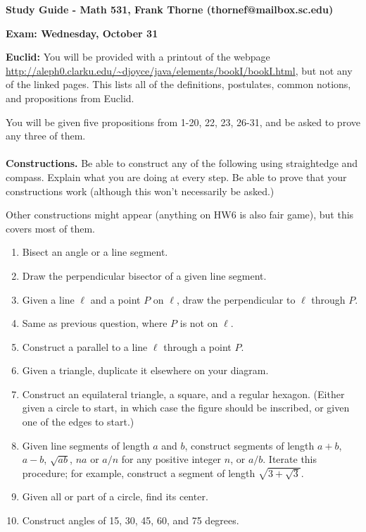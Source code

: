 \documentclass[12pt]{article}
\begin{document}
\setlength{\topmargin}{-2mm}





\begin{center}{\bf Study Guide - Math 531, Frank Thorne (thornef@mailbox.sc.edu)}
\end{center}
\begin{center}
{\bf Exam: Wednesday, October 31}
\end{center}

{\bf Euclid:} You will be provided with a printout of the webpage
\url{http://aleph0.clarku.edu/~djoyce/java/elements/bookI/bookI.html},
but not any of the linked pages. This lists all of the definitions,
postulates, common notions, and propositions from Euclid.

You will be given five propositions from 1-20, 22, 23, 26-31, and be asked to prove any
three of them.
\\
\\
{\bf Constructions.} Be able to construct any of the following using straightedge
and compass. Explain what you are doing at every step. Be able to prove that
your constructions work (although this won't necessarily be asked.)

Other constructions might appear (anything on HW6 is also fair game), but this covers most of them.
\begin{enumerate}[(1)]
\item
Bisect an angle or a line segment.
\item
Draw the perpendicular bisector of a given line segment.
\item
Given a line $\ell$ and a point $P$ on $\ell$, draw the perpendicular to $\ell$
through $P$.
\item
Same as previous question, where $P$ is not on $\ell$.
\item
Construct a parallel to a line $\ell$ through a point $P$.
\item
Given a triangle, duplicate it elsewhere on your diagram.
\item
Construct an equilateral triangle, a square, and a regular hexagon. (Either given 
a circle to start, in which case the figure should be inscribed, or given 
one of the edges to start.)
\item
Given line segments of length $a$ and $b$, construct segments of length $a + b$,
$a - b$, $\sqrt{ab}$, $n a$ or $a/n$ for any positive integer $n$, or $a/b$.
Iterate this procedure; for example, construct a segment of length $\sqrt{3 + \sqrt{3}}$.
\item
Given all or part of a circle, find its center.
\item
Construct angles of 15, 30, 45, 60, and 75 degrees.
\end{enumerate}
\end{document}
